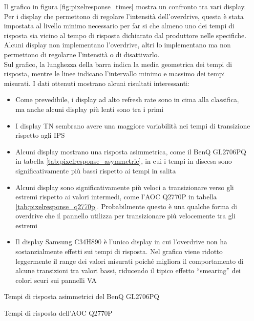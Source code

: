 Il grafico in figura \ref{fig:pixelresponse_times} mostra un confronto tra vari display. Per i display che permettono di regolare l'intensità dell'overdrive, questa è stata impostata al livello minimo necessario per far si che almeno uno dei tempi di risposta sia vicino al tempo di risposta dichiarato dal produttore nelle specifiche. Alcuni display non implementano l'overdrive, altri lo implementano ma non permettono di regolarne l'intensità o di disattivarlo.\\
Sul grafico, la lunghezza della barra indica la media geometrica dei tempi di risposta, mentre le linee indicano l'intervallo minimo e massimo dei tempi misurati. I dati ottenuti mostrano alcuni risultati interessanti:\begin{itemize}
	\item Come prevedibile, i display ad alto refresh rate sono in cima alla classifica, ma anche alcuni display più lenti sono tra i primi
	\item I display TN sembrano avere una maggiore variabilità nei tempi di transizione rispetto agli IPS
	\item Alcuni display mostrano una risposta asimmetrica, come il BenQ GL2706PQ in tabella \ref{tab:pixelresponse_asymmetric}, in cui i tempi in discesa sono significativamente più bassi rispetto ai tempi in salita
	\item Alcuni display sono significativamente più veloci a transizionare verso gli estremi rispetto ai valori intermedi, come l'AOC Q2770P in tabella \ref{tab:pixelresponse_q2770p}. Probabilmente questo è una qualche forma di overdrive che il pannello utilizza per transizionare più velocemente tra gli estremi
	\item Il display Samsung C34H890 è l'unico display in cui l'overdrive non ha sostanzialmente effetti sui tempi di risposta. Nel grafico viene ridotto leggermente il range dei valori misurati poiché migliora il comportamento di alcune transizioni tra valori bassi, riducendo il tipico effetto ``smearing'' dei colori scuri sui pannelli VA
\end{itemize}

\begin{table}[h!]
	\centering
	\caption{\label{tab:pixelresponse_asymmetric}Tempi di risposta asimmetrici del BenQ GL2706PQ}
\end{table}

\begin{table}[h!]
	\centering
	\caption{\label{tab:pixelresponse_q2770p}Tempi di risposta dell'AOC Q2770P}
\end{table}

